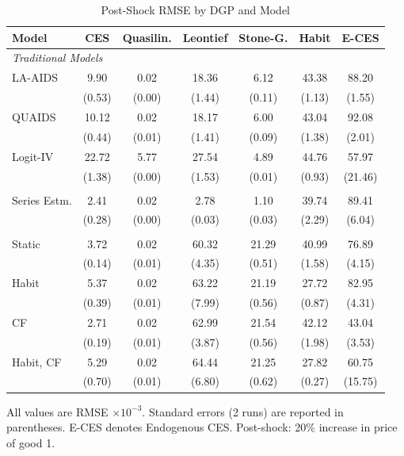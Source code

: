 \begin{table}[htbp]
  \centering
  \caption{Post-Shock RMSE by DGP and Model}
  \label{tab:sim_dgp_recovery_updated}
    \begin{tabular}{lcccccc}
      \toprule
      \textbf{Model} & \textbf{CES} & \textbf{Quasilin.} & \textbf{Leontief} & \textbf{Stone-G.} & \textbf{Habit} & \textbf{E-CES} \\
      \midrule
      \multicolumn{2}{l}{\textit{Traditional Models}} & & & & & \\
      LA-AIDS & 9.90 & 0.02 & 18.36 & 6.12 & 43.38 & 88.20 \\
                   & (0.53) & (0.00) & (1.44) & (0.11) & (1.13) & (1.55) \\
      QUAIDS & 10.12 & 0.02 & 18.17 & 6.00 & 43.04 & 92.08 \\
                  & (0.44) & (0.01) & (1.41) & (0.09) & (1.38) & (2.01) \\
      Logit-IV & 22.72 & 5.77 & 27.54 & 4.89 & 44.76 & 57.97 \\
                    & (1.38) & (0.00) & (1.53) & (0.01) & (0.93) & (21.46) \\
      \addlinespace
      \multicolumn{2}{l}{\textit{Semi-parametric}} & & & & & \\
      Series Estm. & 2.41 & 0.02 & 2.78 & 1.10 & 39.74 & 89.41 \\
                        & (0.28) & (0.00) & (0.03) & (0.03) & (2.29) & (6.04) \\
      \addlinespace
      \multicolumn{2}{l}{\textit{Neural Demand}} & & & & & \\
      Static & 3.72 & 0.02 & 60.32 & 21.29 & 40.99 & 76.89 \\
                  & (0.14) & (0.01) & (4.35) & (0.51) & (1.58) & (4.15) \\
      Habit & 5.37 & 0.02 & 63.22 & 21.19 & 27.72 & 82.95 \\
                 & (0.39) & (0.01) & (7.99) & (0.56) & (0.87) & (4.31) \\
      CF & 2.71 & 0.02 & 62.99 & 21.54 & 42.12 & 43.04 \\
              & (0.19) & (0.01) & (3.87) & (0.56) & (1.98) & (3.53) \\
      Habit, CF & 5.29 & 0.02 & 64.44 & 21.25 & 27.82 & 60.75 \\
                     & (0.70) & (0.01) & (6.80) & (0.62) & (0.27) & (15.75) \\
      \bottomrule
    \end{tabular}
    \begin{tablenotes}\small
      \item All values are RMSE $\times 10^{-3}$. Standard errors (2 runs) are reported in parentheses. E-CES denotes Endogenous CES. Post-shock: 20\% increase in price of good 1.
    \end{tablenotes}
\end{table}
